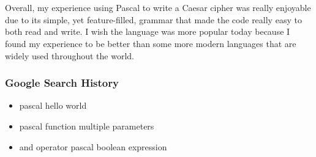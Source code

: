 \documentclass[letterpaper, 10pt, DIV=13]{scrartcl}
\numberwithin{equation}{section}
\numberwithin{figure}{section}
\numberwithin{table}{section}
\begin{document}
\\ \\
Overall, my experience using Pascal to write a Caesar cipher was really enjoyable due to its simple, yet feature-filled, grammar that made the code really easy to both read and write. I wish the language was more popular today because I found my experience to be better than some more modern languages that are widely used throughout the world.

\subsubsection{Google Search History}
\begin{itemize}
	\item pascal hello world
	\item pascal function multiple parameters
	\item and operator pascal boolean expression
\end{itemize}
\end{document}
